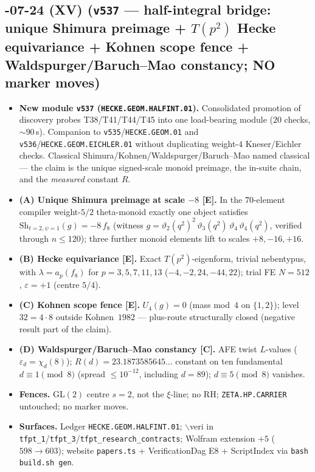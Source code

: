\documentclass[11pt]{article}
\providecommand{\mE}{\textbf{[E]}}\providecommand{\mC}{\textbf{[C]}}
\begin{document}
\subsection*{-07-24 (XV) (\texttt{v537} --- half-integral bridge: unique Shimura preimage + $T(p^2)$ Hecke equivariance + Kohnen scope fence + Waldspurger/Baruch--Mao constancy; NO marker moves)}
\begin{itemize}[leftmargin=1.5em]
\item \textbf{New module \texttt{v537} (\texttt{HECKE.GEOM.HALFINT.01}).} Consolidated promotion of discovery
probes T38/T41/T44/T45 into one load-bearing module ($20$ checks, $\sim90$\,s). Companion to
\texttt{v535}/\texttt{HECKE.GEOM.01} and \texttt{v536}/\texttt{HECKE.GEOM.EICHLER.01} without duplicating
weight-$4$ Kneser/Eichler checks. Classical Shimura/Kohnen/Waldspurger/Baruch--Mao named classical ---
the claim is the unique signed-scale monoid preimage, the in-suite chain, and the \emph{measured}
constant $R$.
\item \textbf{(A) Unique Shimura preimage at scale $-8$ \mE.} In the $70$-element compiler weight-$5/2$
theta-monoid exactly one object satisfies $\mathrm{Sh}_{t=2,\psi=1}(g)=-8\,f_8$ (witness
$g=\vartheta_2(q^2)^2\,\vartheta_3(q^2)\,\vartheta_4\,\vartheta_4(q^2)$, verified through $n\le120$);
three further monoid elements lift to scales $+8,-16,+16$.
\item \textbf{(B) Hecke equivariance \mE.} Exact $T(p^2)$-eigenform, trivial nebentypus, with
$\lambda=a_p(f_8)$ for $p=3,5,7,11,13$ ($-4,-2,24,-44,22$); trial FE $N=512$, $\varepsilon=+1$
(centre $5/4$).
\item \textbf{(C) Kohnen scope fence \mE.} $U_4(g)=0$ (mass mod~$4$ on $\{1,2\}$); level
$32=4\cdot8$ outside Kohnen~$1982$ --- plus-route structurally closed (negative result part of the
claim).
\item \textbf{(D) Waldspurger/Baruch--Mao constancy \mC.} AFE twist $L$-values
($\varepsilon_d=\chi_d(8)$); $R(d)=23.1873585645\ldots$ constant on ten fundamental
$d\equiv1\pmod8$ (spread $\le10^{-12}$, including $d=89$); $d\equiv5\pmod8$ vanishes.
\item \textbf{Fences.} GL$(2)$ centre $s=2$, not the $\xi$-line; no RH; \texttt{ZETA.HP.CARRIER}
untouched; no marker moves.
\item \textbf{Surfaces.} Ledger \texttt{HECKE.GEOM.HALFINT.01}; $\backslash$veri in
\texttt{tfpt\_1}/\texttt{tfpt\_3}/\texttt{tfpt\_research\_contracts}; Wolfram extension $+5$
($598\to603$); website \texttt{papers.ts} + VerificationDag E8 + ScriptIndex via
\texttt{bash build.sh gen}.
\end{itemize}
\end{document}
